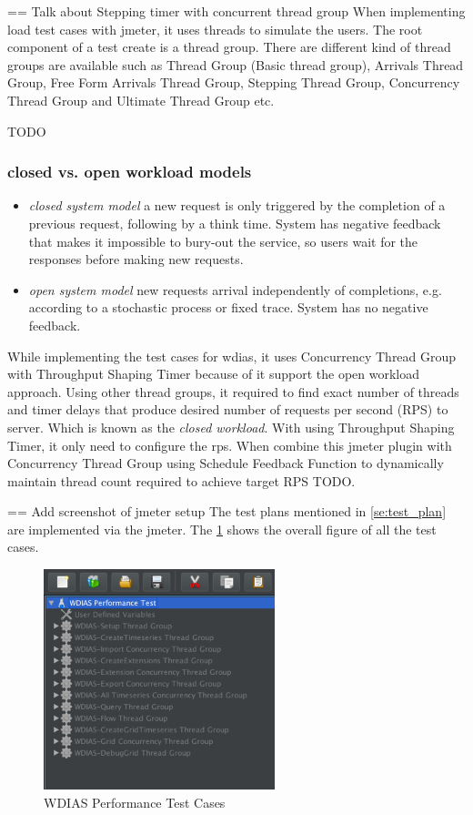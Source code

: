 == Talk about Stepping timer with concurrent thread group
When implementing load test cases with \acrshort{jmeter}, it uses threads to simulate the users. The root component of a test create is a thread group. There are different kind of thread groups are available such as Thread Group (Basic thread group), Arrivals Thread Group, Free Form Arrivals Thread Group, Stepping Thread Group, Concurrency Thread Group and Ultimate Thread Group etc.

TODO
\subsubsection{closed vs. open workload models} \cite{Haggett1998AnWales}
\begin{itemize}
    \item \emph{closed system model} a new request is only triggered by the completion of a previous request, following by a think time. System has negative feedback that makes it impossible to bury-out the service, so users wait for the responses before making new requests.
    \item \emph{open system model} new requests arrival independently of completions, e.g. according to a stochastic process or fixed trace. System has no negative feedback.
\end{itemize}
While implementing the test cases for \acrshort{wdias}, it uses Concurrency Thread Group with Throughput Shaping Timer because of it support the open workload approach.
Using other thread groups, it required to find exact number of threads and timer delays that produce desired number of requests per second (RPS) to server. Which is known as the \emph{closed workload}.
With using Throughput Shaping Timer, it only need to configure the \acrfull{rps}. When combine this \acrshort{jmeter} plugin with Concurrency Thread Group using Schedule Feedback Function to dynamically maintain thread count required to achieve target RPS \cite{Haggett1998AnWales} TODO.

== Add screenshot of jmeter setup
The test plans mentioned in \ref{se:test_plan} are implemented via the \acrshort{jmeter}. The \ref{fi:wdias_performance_test} shows the overall figure of all the test cases.

\begin{figure}[htp]
    \centering
    \includegraphics[width=0.6\textwidth]{results/work_load/wdias_performance_test.png}
    \caption{WDIAS Performance Test Cases}
    \label{fi:wdias_performance_test}
\end{figure}

